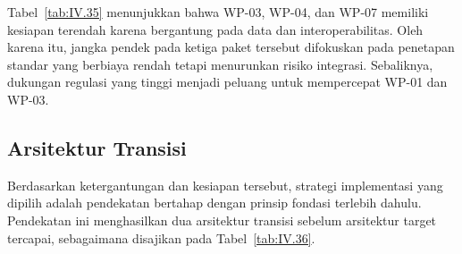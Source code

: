 Tabel~\ref{tab:IV.35} menunjukkan bahwa WP-03, WP-04, dan WP-07 memiliki kesiapan terendah karena bergantung pada data dan interoperabilitas. Oleh karena itu, jangka pendek pada ketiga paket tersebut difokuskan pada penetapan standar yang berbiaya rendah tetapi menurunkan risiko integrasi. Sebaliknya, dukungan regulasi yang tinggi menjadi peluang untuk mempercepat WP-01 dan WP-03.

\subsection{Arsitektur Transisi}
\label{sec:IV.7.5}

Berdasarkan ketergantungan dan kesiapan tersebut, strategi implementasi yang dipilih adalah pendekatan bertahap dengan prinsip fondasi terlebih dahulu. Pendekatan ini menghasilkan dua arsitektur transisi sebelum arsitektur target tercapai, sebagaimana disajikan pada Tabel~\ref{tab:IV.36}.

